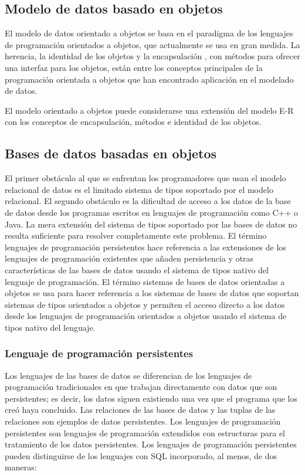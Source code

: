 \documentclass[preprint,12pt]{elsarticle}
\begin{document}
\subsection {\textbf{Modelo de datos basado en objetos\\}} \cite{SilberschatzKorthSudarshan2006}
El modelo de datos orientado a objetos se basa en el paradigma de los lenguajes de programación orientados a objetos, que actualmente se usa en gran medida. La herencia, la identidad de los objetos y la encapsulación , con métodos para ofrecer una interfaz para los objetos, están entre los conceptos principales de la programación orientada a objetos que han encontrado aplicación en el modelado de datos.

El modelo orientado a objetos puede considerarse una extensión del modelo E-R con los conceptos de encapsulación, métodos e identidad de los objetos.




\subsection{\textbf{Bases de datos basadas en objetos}} 
El primer obstáculo al que se enfrentan los programadores que usan el modelo relacional de datos es el limitado sistema de tipos soportado por el modelo relacional. El segundo obstáculo es la dificultad de acceso a los datos de la base de datos desde los programas escritos en lenguajes de programación como C++ o Java. La mera extensión del sistema de tipos soportado por las bases de datos no resulta suficiente para resolver completamente este problema.
El término lenguajes de programación persistentes hace referencia a las extensiones de los lenguajes de programación existentes que añaden persistencia y otras características de las bases de datos usando el sistema de tipos nativo del lenguaje de programación. El término sistemas de bases de datos orientadas a objetos se usa para hacer referencia a los sistemas de bases de datos que soportan sistemas de tipos orientados a objetos y permiten el acceso directo a los datos desde los lenguajes de programación orientados a objetos usando el sistema de tipos nativo del lenguaje. 
\cite{SilberschatzKorthSudarshan2006}

\subsubsection{\textbf{Lenguaje de programación persistentes}} 
Los lenguajes de las bases de datos se diferencian de los lenguajes de programación tradicionales en que trabajan directamente con datos que son persistentes; es decir, los datos siguen existiendo una vez que el programa que los creó haya concluido. Las relaciones de las bases de datos y las tuplas de las relaciones son ejemplos de datos persistentes.
Los lenguajes de programación persistentes son lenguajes de programación extendidos con estructuras para el tratamiento de los datos persistentes. Los lenguajes de programación persistentes pueden distinguirse de los lenguajes con SQL incorporado, al menos, de dos maneras:
\end{document}
